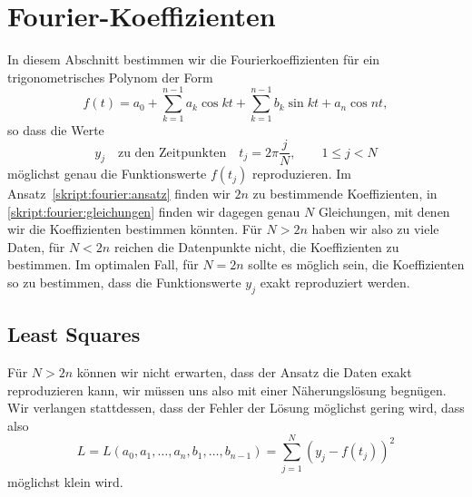 %
%
%
\section{Fourier-Koeffizienten}
In diesem Abschnitt
bestimmen wir die Fourierkoeffizienten für ein trigonometrisches Polynom
der Form
\begin{equation}
f(t)
=
a_0 + \sum_{k=1}^{n-1} a_k\cos kt + \sum_{k=1}^{n-1} b_k\sin kt + a_n\cos nt,
\label{skript:fourier:ansatz}
\end{equation}
so dass die Werte
\begin{equation}
y_j \quad\text{zu den Zeitpunkten}\quad t_j=2\pi\frac{j}{N},\qquad 1\le j< N
\label{skript:fourier:gleichungen}
\end{equation}
möglichst genau die Funktionswerte $f(t_j)$ reproduzieren.
Im Ansatz~\eqref{skript:fourier:ansatz} finden wir $2n$ zu bestimmende 
Koeffizienten, in \eqref{skript:fourier:gleichungen} finden wir dagegen
genau $N$ Gleichungen, mit denen wir die Koeffizienten bestimmen könnten.
Für $N>2n$ haben wir also zu viele Daten, für $N<2n$ reichen die Datenpunkte
nicht, die Koeffizienten zu bestimmen.
Im optimalen Fall, für $N=2n$ sollte es möglich sein, die Koeffizienten so
zu bestimmen, dass die Funktionswerte $y_j$ exakt reproduziert werden.

\subsection{Least Squares}
Für $N>2n$ können wir nicht erwarten, dass der Ansatz die Daten
exakt reproduzieren kann, wir müssen uns also mit einer
Näherungslösung begnügen.
Wir verlangen stattdessen, dass der Fehler der Lösung möglichst gering
wird, dass also
\[
L=L(a_0,a_1,\dots,a_n,b_1,\dots,b_{n-1})= \sum_{j=1}^N (y_j - f(t_j))^2
\]
möglichst klein wird.

